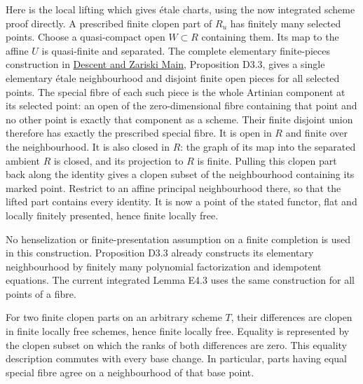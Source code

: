 \documentclass[11pt,a4paper,openany]{report}
\begin{document}
Here is the local lifting which gives étale charts, using the now integrated scheme proof directly. A prescribed finite clopen part of \(R_u\) has finitely many selected points. Choose a quasi-compact open \(W\subset R\) containing them. Its map to the affine \(U\) is quasi-finite and separated. The complete elementary finite-pieces construction in \href{https://github.com/KokunoYumeto/open-math-courses/blob/main/docs/courses/AG-RG/AG-RG-S04.md}{Descent and Zariski Main}, Proposition D3.3, gives a single elementary étale neighbourhood and disjoint finite open pieces for all selected points. The special fibre of each such piece is the whole Artinian component at its selected point: an open of the zero-dimensional fibre containing that point and no other point is exactly that component as a scheme. Their finite disjoint union therefore has exactly the prescribed special fibre. It is open in \(R\) and finite over the neighbourhood. It is also closed in \(R\): the graph of its map into the separated ambient \(R\) is closed, and its projection to \(R\) is finite. Pulling this clopen part back along the identity gives a clopen subset of the neighbourhood containing its marked point. Restrict to an affine principal neighbourhood there, so that the lifted part contains every identity. It is now a point of the stated functor, flat and locally finitely presented, hence finite locally free.

No henselization or finite-presentation assumption on a finite completion is used in this construction. Proposition D3.3 already constructs its elementary neighbourhood by finitely many polynomial factorization and idempotent equations. The current integrated Lemma E4.3 uses the same construction for all points of a fibre.

For two finite clopen parts on an arbitrary scheme \(T\), their differences are clopen in finite locally free schemes, hence finite locally free. Equality is represented by the clopen subset on which the ranks of both differences are zero. This equality description commutes with every base change. In particular, parts having equal special fibre agree on a neighbourhood of that base point.
\end{document}
